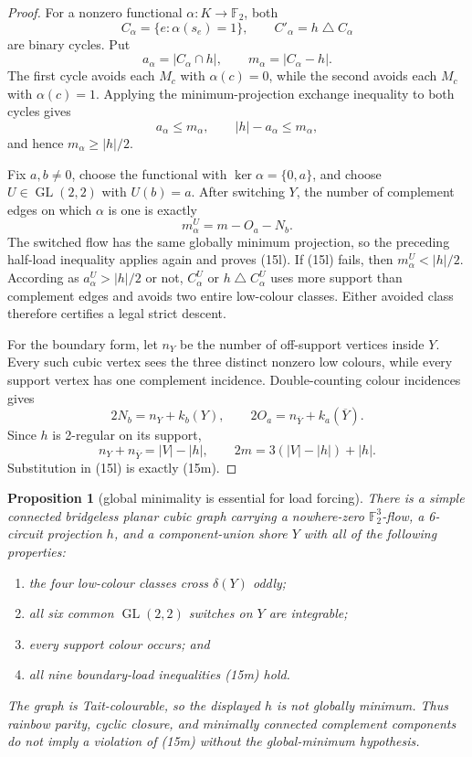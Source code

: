\documentclass[11pt]{article}
\newtheorem{proposition}[theorem]{Proposition}
\theoremstyle{definition}
\theoremstyle{remark}
\newcommand{\F}{\mathbb F}
\begin{document}
\begin{proof}
For a nonzero functional \(\alpha:K\to\F_2\), both
\[
 C_\alpha=\{e:\alpha(s_e)=1\},
 \qquad C'_\alpha=h\mathbin\triangle C_\alpha
\]
are binary cycles.  Put
\[
 a_\alpha=|C_\alpha\cap h|,
 \qquad m_\alpha=|C_\alpha-h|.
\]
The first cycle avoids each \(M_c\) with \(\alpha(c)=0\), while the
second avoids each \(M_c\) with \(\alpha(c)=1\).  Applying the
minimum-projection exchange inequality to both cycles gives
\[
                     a_\alpha\le m_\alpha,\qquad
                     |h|-a_\alpha\le m_\alpha,
\]
and hence \(m_\alpha\ge|h|/2\).

Fix \(a,b\ne0\), choose the functional with
\(\ker\alpha=\{0,a\}\), and choose
\(U\in\operatorname{GL}(2,2)\) with \(U(b)=a\).
After switching \(Y\), the number of complement edges on which
\(\alpha\) is one is exactly
\[
                         m_\alpha^U=m-O_a-N_b.
\]
The switched flow has the same globally minimum projection, so the
preceding half-load inequality applies again and proves (15l).  If
(15l) fails, then \(m_\alpha^U<|h|/2\).  According as
\(a_\alpha^U>|h|/2\) or not, \(C_\alpha^U\) or
\(h\mathbin\triangle C_\alpha^U\) uses more support than complement
edges and avoids two entire low-colour classes.  Either avoided class
therefore certifies a legal strict descent.

For the boundary form, let \(n_Y\) be the number of off-support vertices
inside \(Y\).  Every such cubic vertex sees the three distinct nonzero
low colours, while every support vertex has one complement incidence.
Double-counting colour incidences gives
\[
                  2N_b=n_Y+k_b(Y),\qquad
                  2O_a=n_{\overline Y}+k_a(\overline Y).
\]
Since \(h\) is 2-regular on its support,
\[
  n_Y+n_{\overline Y}=|V|-|h|,
  \qquad 2m=3(|V|-|h|)+|h|.
\]
Substitution in (15l) is exactly (15m).
\end{proof}

\begin{proposition}[global minimality is essential for load forcing]
\label{prop:rainbowloadcounterstate}
There is a simple connected bridgeless planar cubic graph carrying a
nowhere-zero \(\F_2^3\)-flow, a 6-circuit projection \(h\), and a
component-union shore \(Y\) with all of the following properties:
\begin{enumerate}
  \item the four low-colour classes cross \(\delta(Y)\) oddly;
  \item all six common \(\operatorname{GL}(2,2)\) switches on \(Y\) are
        integrable;
  \item every support colour occurs; and
  \item all nine boundary-load inequalities (15m) hold.
\end{enumerate}
The graph is Tait-colourable, so the displayed \(h\) is not globally
minimum.  Thus rainbow parity, cyclic closure, and minimally connected
complement components do not imply a violation of (15m) without the
global-minimum hypothesis.
\end{proposition}
\end{document}
